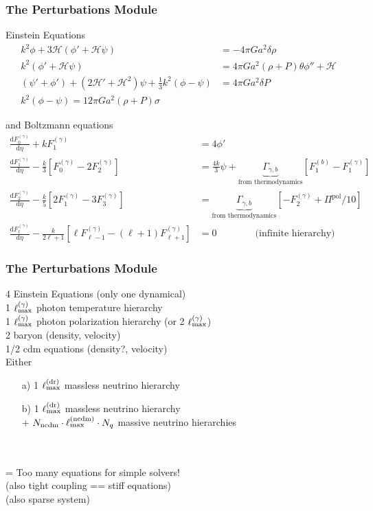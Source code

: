 \begin{frame}[fragile]
	\frametitle{The Perturbations Module}
	
	Einstein Equations
	\begin{align}
		k^2 \phi + 3\mathcal{H} (\phi'+\mathcal{H}\psi) &= -4\pi G a^2 \delta \rho\\
		k^2 (\phi'+\mathcal{H}\psi) &= 4\pi G a^2 (\rho+P) \theta
		\phi''+\mathcal{H}\\ (\psi'+\phi')+(2\mathcal{H}'+\mathcal{H}^2) \psi + \frac{1}{3}k^2 (\phi-\psi) &= 4\pi G a^2 \delta P\\
		k^2 (\phi-\psi) = 12\pi G a^2 (\rho+P) \sigma
	\end{align}
	
	and Boltzmann equations
	\begin{align}
		\frac{\mathrm{d}F_0^{(\gamma)}}{\mathrm{d}\eta} + k F_1^{(\gamma)} &= 4\phi'\\
		\frac{\mathrm{d}F_1^{(\gamma)}}{\mathrm{d}\eta} - \frac{k}{3} \left[F_0^{(\gamma)} - 2 F_2^{(\gamma)}\right] &= \frac{4 k}{3} \psi + \underbrace{\Gamma_{\gamma,b}}_\text{from thermodynamics} [F_1^{(b)}-F_1^{(\gamma)}]\\
		\frac{\mathrm{d}F_2^{(\gamma)}}{\mathrm{d}\eta} - \frac{k}{5} \left[2 F_1^{(\gamma)} - 3 F_3^{(\gamma)}\right] &= \underbrace{\Gamma_{\gamma,b}}_\text{from thermodynamics} [-F_2^{(\gamma)}+\Pi^\mathrm{pol}/10]\\
		\frac{\mathrm{d}F_\ell^{(\gamma)}}{\mathrm{d}\eta} - \frac{k}{2\ell+1} \left[\ell F_{\ell-1}^{(\gamma)} - (\ell+1) F_{\ell+1}^{(\gamma)}\right] &= 0 \qquad \qquad \text{(infinite hierarchy)}
	\end{align}
\end{frame}

\begin{frame}[fragile]
	\frametitle{The Perturbations Module}
	
	4 Einstein Equations (only one dynamical)\\
	1 $\ell^{(\gamma)}_{\rm max}$ photon temperature hierarchy \\
	1 $\ell^{(\gamma)}_{\rm max}$ photon polarization hierarchy (or 2 $\ell^{(\gamma)}_{\rm max}$) \\
	2 baryon (density, velocity) \\
	1/2 cdm equations (density?, velocity)\\
	Either
	\begin{itemize}
		\item[a)] 1 $\ell^{\mathrm{(dr)}}_{\rm max}$ massless neutrino hierarchy
		\item[b)] 1 $\ell^{\mathrm{(dr)}}_{\rm max}$ massless neutrino hierarchy \\+ $N_\mathrm{ncdm} \cdot \ell^{\mathrm{(ncdm)}}_{\rm max} \cdot N_q$ massive neutrino hierarchies
	\end{itemize}
	\mbox{}\\ \mbox{}\\
	= Too many equations for simple solvers!\\
	(also tight coupling == stiff equations)\\
	(also sparse system)
\end{frame}

